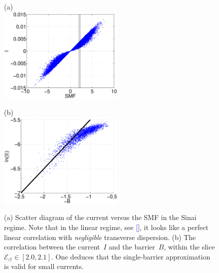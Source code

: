 \documentclass[aps,prl,floats,floatfix,twocolumn]{revtex4}
\renewcommand{\cite}[1]{\textcolor{blue}{[\onlinecite{#1}}]} %
\begin{document}
\begin{figure}

\hspace*{-10mm} (a) \\
\includegraphics[width=6cm]{IvsSMF2.eps}

\vspace*{5mm}

\hspace*{-10mm} (b) \\
\includegraphics[width=6cm]{BvsLnI.eps}

\caption{(a) Scatter diagram of the current versus the SMF in the Sinai regime.
Note that in the linear regime, see \cite{SM}, it looks like a perfect linear 
correlation with {\em negligible} transverse dispersion.  
(b) The correlation between the current~$I$ and the barrier~$B$,  
within the slice ${\mathcal{E}_{\circlearrowleft} \in [2.0,2.1]}$. 
One deduces that the single-barrier approximation is valid for small currents.}

\label{f4}
\end{figure}
\end{document}
